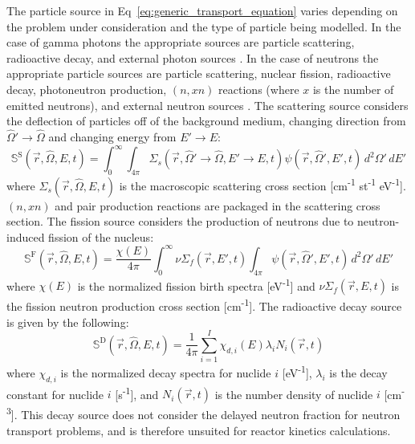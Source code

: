 The particle source in Eq~\ref{eq:generic_transport_equation} varies depending on the problem under consideration and the type of particle being modelled. In the case of gamma photons the appropriate sources are particle scattering, radioactive decay, and external photon sources \cite{radiation_shielding}. In the case of neutrons the appropriate particle sources are particle scattering, nuclear fission, radioactive decay, photoneutron production, $(n, xn)$ reactions (where $x$ is the number of emitted neutrons), and external neutron sources \cite{computational_methods}. The scattering source considers the deflection of particles off of the background medium, changing direction from $\hat{\Omega}'\rightarrow\hat{\Omega}$ and changing energy from $E'\rightarrow E$:
\begin{equation}\label{eq:scattering_src}
    \mathbb{S}^{\text{S}}(\vec{r}, \hat{\Omega}, E, t) = \int_{0}^{\infty}\int_{4\pi} \Sigma_{s}(\vec{r}, \hat{\Omega}' \rightarrow \hat{\Omega}, E' \rightarrow E, t)\psi(\vec{r}, \hat{\Omega}', E', t)\, d^{2}\Omega'\,dE'
\end{equation}
where $\Sigma_{s}(\vec{r}, \hat{\Omega}, E, t)$ is the macroscopic scattering cross section [cm\textsuperscript{-1} st\textsuperscript{-1} eV\textsuperscript{-1}]. $(n, xn)$ and pair production reactions are packaged in the scattering cross section. The fission source considers the production of neutrons due to neutron-induced fission of the nucleus:
\begin{equation}\label{eq:fission_src}
    \mathbb{S}^{\text{F}}(\vec{r}, \hat{\Omega}, E, t) = \frac{\chi(E)}{4\pi}\int_{0}^{\infty} \nu\Sigma_{f}(\vec{r}, E', t)\int_{4\pi}\psi(\vec{r}, \hat{\Omega}', E', t)\, d^{2}\Omega'\, dE'
\end{equation}
where $\chi(E)$ is the normalized fission birth spectra [eV\textsuperscript{-1}] and $\nu\Sigma_{f}(\vec{r}, E, t)$ is the fission neutron production cross section [cm\textsuperscript{-1}]. The radioactive decay source is given by the following:
\begin{equation}\label{eq:decay_src}
    \mathbb{S}^{\text{D}}(\vec{r}, \hat{\Omega}, E, t) = \frac{1}{4\pi}\sum_{i = 1}^{I} \chi_{d,i}(E)\lambda_{i}N_{i}(\vec{r}, t)
\end{equation}
where $\chi_{d,i}$ is the normalized decay spectra for nuclide $i$ [eV\textsuperscript{-1}], $\lambda_{i}$ is the decay constant for nuclide $i$ [s\textsuperscript{-1}], and $N_{i}(\vec{r}, t)$ is the number density of nuclide $i$ [cm\textsuperscript{-3}]. This decay source does not consider the delayed neutron fraction for neutron transport problems, and is therefore unsuited for reactor kinetics calculations. 

